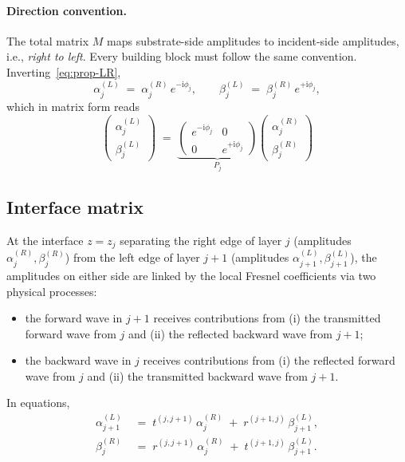 \documentclass[aps,prb,onecolumn,superscriptaddress,nofootinbib,11pt]{revtex4-2}
\newcommand{\ii}{\mathrm{i}}
\begin{document}
\paragraph{Direction convention.}
The total matrix $M$ maps substrate-side amplitudes to incident-side amplitudes, i.e., \emph{right to left}. Every building block must follow the same convention. Inverting~\eqref{eq:prop-LR},
\begin{equation}
  \alpha_j^{(L)} \;=\; \alpha_j^{(R)}\, e^{-\ii \phi_j},
  \qquad
  \beta_j^{(L)}  \;=\; \beta_j^{(R)}\, e^{+\ii \phi_j},
  \label{eq:prop-RL}
\end{equation}
which in matrix form reads
\begin{equation}
  \boxed{\;
    \begin{pmatrix} \alpha_j^{(L)} \\[2pt] \beta_j^{(L)}
    \end{pmatrix}
    \;=\;
    \underbrace{
      \begin{pmatrix}
        e^{-\ii \phi_j} & 0 \\[2pt]
        0 & e^{+\ii \phi_j}
      \end{pmatrix}
    }_{\displaystyle P_j}
    \begin{pmatrix} \alpha_j^{(R)} \\[2pt] \beta_j^{(R)}
    \end{pmatrix}
  \;}
  \label{eq:Pj-box}
\end{equation}

\subsection{Interface matrix}
\label{sec:interface-matrix}

At the interface $z = z_j$ separating the right edge of layer $j$ (amplitudes $\alpha_j^{(R)}, \beta_j^{(R)}$) from the left edge of layer $j{+}1$ (amplitudes $\alpha_{j+1}^{(L)}, \beta_{j+1}^{(L)}$), the amplitudes on either side are linked by the local Fresnel coefficients via two physical processes:
\begin{itemize}
  \item the forward wave in $j{+}1$ receives contributions from (i) the transmitted forward wave from $j$ and (ii) the reflected backward wave from $j{+}1$;
  \item the backward wave in $j$ receives contributions from (i) the reflected forward wave from $j$ and (ii) the transmitted backward wave from $j{+}1$.
\end{itemize}
In equations,
\begin{align}
  \alpha_{j+1}^{(L)} &\;=\; t^{(j,j+1)}\, \alpha_j^{(R)} \;+\; r^{(j+1,j)}\, \beta_{j+1}^{(L)},
  \tag{$\star$} \label{eq:if-star}\\[2pt]
  \beta_j^{(R)} &\;=\; r^{(j,j+1)}\, \alpha_j^{(R)} \;+\; t^{(j+1,j)}\, \beta_{j+1}^{(L)}.
  \tag{$\star\star$} \label{eq:if-starstar}
\end{align}
\end{document}
